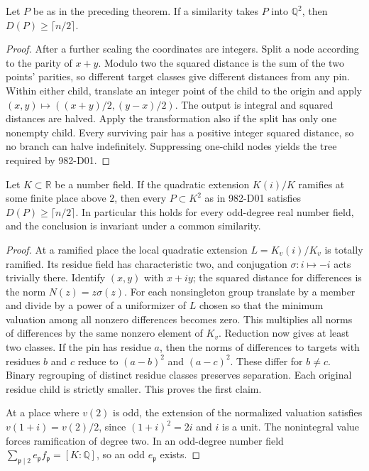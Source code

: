 \begin{theorem}[982-D02]
Let \(P\) be as in the preceding theorem. If a similarity takes \(P\) into \(\mathbb Q^2\), then \(D(P)\ge\lceil n/2\rceil\).
\end{theorem}

\begin{proof}
After a further scaling the coordinates are integers. Split a node according to the parity of \(x+y\). Modulo two the squared distance is the sum of the two points' parities, so different target classes give different distances from any pin. Within either child, translate an integer point of the child to the origin and apply
\((x,y)\mapsto((x+y)/2,(y-x)/2)\).
The output is integral and squared distances are halved. Apply the transformation also if the split has only one nonempty child. Every surviving pair has a positive integer squared distance, so no branch can halve indefinitely. Suppressing one-child nodes yields the tree required by 982-D01.
\end{proof}

\begin{proposition}[982-D03, 982-D04]
Let \(K\subset\mathbb R\) be a number field. If the quadratic extension \(K(i)/K\) ramifies at some finite place above \(2\), then every \(P\subset K^2\) as in 982-D01 satisfies \(D(P)\ge\lceil n/2\rceil\). In particular this holds for every odd-degree real number field, and the conclusion is invariant under a common similarity.
\end{proposition}

\begin{proof}
At a ramified place the local quadratic extension \(L=K_v(i)/K_v\) is totally ramified. Its residue field has characteristic two, and conjugation \(\sigma:i\mapsto-i\) acts trivially there. Identify \((x,y)\) with \(x+iy\); the squared distance for differences is the norm \(N(z)=z\sigma(z)\).
For each nonsingleton group translate by a member and divide by a power of a uniformizer of \(L\) chosen so that the minimum valuation among all nonzero differences becomes zero. This multiplies all norms of differences by the same nonzero element of \(K_v\). Reduction now gives at least two classes. If the pin has residue \(a\), then the norms of differences to targets with residues \(b\) and \(c\) reduce to \((a-b)^2\) and \((a-c)^2\). These differ for \(b\ne c\). Binary regrouping of distinct residue classes preserves separation. Each original residue child is strictly smaller. This proves the first claim.

At a place where \(v(2)\) is odd, the extension of the normalized valuation satisfies \(v(1+i)=v(2)/2\), since \((1+i)^2=2i\) and \(i\) is a unit. The nonintegral value forces ramification of degree two. In an odd-degree number field \(\sum_{\mathfrak p\mid2} e_{\mathfrak p} f_{\mathfrak p}=[K:\mathbb Q]\), so an odd \(e_{\mathfrak p}\) exists.
\end{proof}

